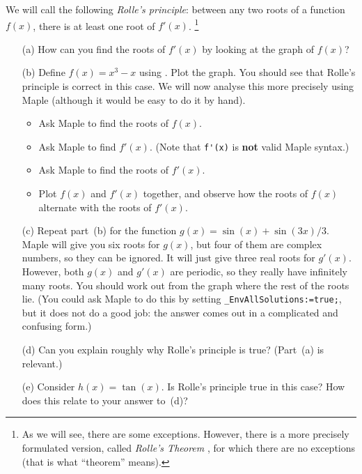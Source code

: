 \documentclass[a4paper,10pt]{amsbook}
\numberwithin{example}{chapter}
\begin{document}
\begin{exercise}\label{ex-rolle}
 We will call the following \emph{Rolle's principle}: between any two
 roots of a function $f(x)$, there is at least one root of $f'(x)$. 
 \footnote{ As we will see, there are some exceptions.  However, there
   is a more precisely formulated version, called \emph{Rolle's
   Theorem} , for which there are no exceptions (that is what
   ``theorem'' means).  
 } 
 \begin{itemize}
  \item[(a)] How can you find the roots of $f'(x)$ by looking at the
   graph of $f(x)$? 
  \item[(b)] Define $f(x)=x^3-x$ using \note{\NOTEarrow}. 
   Plot the graph.  You should see that Rolle's principle is
   correct in this case.  We will now analyse this more precisely using
   Maple (although it would be easy to do it by hand). 
   \begin{itemize}
    \item Ask Maple \note{\NOTEroots} to find the roots of $f(x)$. 
    \item Ask Maple \note{\NOTEdiff,\NOTEleibniz} to find
     $f'(x)$.  (Note that \verb~f'(x)~ is \textbf{not} valid
     Maple syntax.) 
    \item Ask Maple to find the roots of $f'(x)$. 
    \item Plot $f(x)$ and $f'(x)$ together, and observe how the roots
     of $f(x)$ alternate with the roots of $f'(x)$. 
   \end{itemize}
  \item[(c)] Repeat part~(b) for the function
   $g(x)=\sin(x)+\sin(3x)/3$.  Maple will give you six roots for
   $g(x)$, but four of them are complex numbers, so they can be
   ignored.  It will just give three real roots for $g'(x)$.  However,
   both $g(x)$ and $g'(x)$ are periodic, so they really have
   infinitely many roots.  You should work out from the graph
   where the rest of the roots lie.  (You could ask Maple to do this
   by setting \verb~_EnvAllSolutions:=true;~, but it does not do a
   good job: the answer comes out in a complicated and confusing
   form.) 
  \item[(d)] Can you explain roughly why Rolle's principle is true? 
   (Part~(a) is relevant.) 
  \item[(e)] Consider $h(x)=\tan(x)$.  Is Rolle's principle true in
   this case?  How does this relate to your answer to~(d)?  
 \end{itemize}
\end{exercise}
\end{document}
